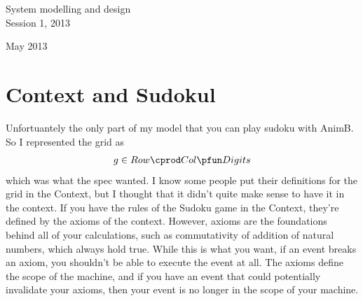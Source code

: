 \documentclass[a4paper]{article}
\author{Vincent Tran z3415372}
\begin{document}
\thispagestyle{empty}      %
\begin{flushright}{\Large
System modelling and design \\[.3em]
Session 1, 2013}

 May 2013
\end{flushright}

\vfill
{}%
\vfill
\newpage
\setcounter{page}{1}
\section{Context and Sudokul}
Unfortuantely the only part of my model that you can play sudoku with AnimB. So I represented the grid as
\begin{align*}
 g \in  Row\cprod Col \pfun  Digits 
\end{align*}
which was what the spec wanted. I know some people put their definitions for the grid in the Context, but I thought that it didn't quite make sense to have it in the context. If you have the rules of the Sudoku game in the Context, they're defined by the axioms of the context. However, axioms are the foundations behind all of your calculations, such as commutativity of addition of natural numbers, which always hold true. While this is what you want, if an event breaks an axiom, you shouldn't be able to execute the event at all. The axioms define the scope of the machine, and if you have an event that could potentially invalidate your axioms, then your event is no longer in the scope of your machine.\\
\end{document}
